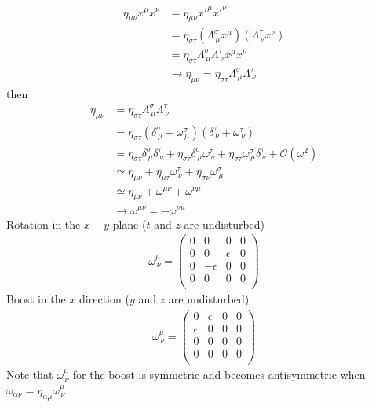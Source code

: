 \documentclass[../main.tex]{subfiles}
\begin{document}
\begin{align}
\eta_{\mu\nu}x^\mu x^\nu
&=\eta_{\mu\nu}x'^\mu x'^\nu\\
&=\eta_{\sigma\tau}(\Lambda^\sigma_{\,\mu}x^\mu)(\Lambda^\tau_{\,\nu}x^\nu)\\
&=\eta_{\sigma\tau}\Lambda^\sigma_{\,\mu}\Lambda^\tau_{\,\nu}x^\mu x^\nu\\
&\rightarrow \eta_{\mu\nu}=\eta_{\sigma\tau}\Lambda^\sigma_{\,\mu}\Lambda^\tau_{\,\nu}
\end{align}
then
\begin{align}
\eta_{\mu\nu}
&=\eta_{\sigma\tau}\Lambda^\sigma_{\,\mu}\Lambda^\tau_{\,\nu}\\
&=\eta_{\sigma\tau}(\delta^\sigma_{\,\mu}+\omega^\sigma_{\,\mu})(\delta^\tau_{\,\nu}+\omega^\tau_{\,\nu})\\
&=\eta_{\sigma\tau}\delta^\sigma_{\,\mu}\delta^\tau_{\,\nu}
+\eta_{\sigma\tau}\delta^\sigma_{\,\mu}\omega^\tau_{\,\nu}
+\eta_{\sigma\tau}\omega^\sigma_{\,\mu}\delta^\tau_{\,\nu}+\mathcal{O}(\omega^2)\\
&\simeq\eta_{\mu\nu}+\eta_{\mu\tau}\omega^\tau_{\,\nu}+\eta_{\sigma\nu}\omega^\sigma_{\,\mu}\\
&\simeq\eta_{\mu\nu}+\omega^{\mu\nu}+\omega^{\nu\mu}\\
&\rightarrow\omega^{\mu\nu}=-\omega^{\nu\mu}
\end{align}
Rotation in the $x-y$ plane ($t$ and $z$ are undisturbed)
\begin{align}
\omega^\mu_{\,\nu}=
\left(
\begin{matrix}
0 & 0 & 0 & 0\\
0 & 0 & \epsilon & 0\\
0 & -\epsilon & 0 & 0\\
0 & 0 & 0 & 0\\
\end{matrix}
\right)
\end{align}
Boost in the $x$ direction ($y$ and $z$ are undisturbed)
\begin{align}
\omega^\mu_{\,\nu}=
\left(
\begin{matrix}
0 & \epsilon & 0 & 0\\
\epsilon & 0 & 0 & 0\\
0 & 0 & 0 & 0\\
0 & 0 & 0 & 0\\
\end{matrix}
\right)
\end{align}
Note that $\omega^\mu_{\,\nu}$ for the boost is symmetric and becomes antisymmetric when $\omega_{\alpha\nu}=\eta_{\alpha\mu}\omega^\mu_{\,\nu}$.
\end{document}
